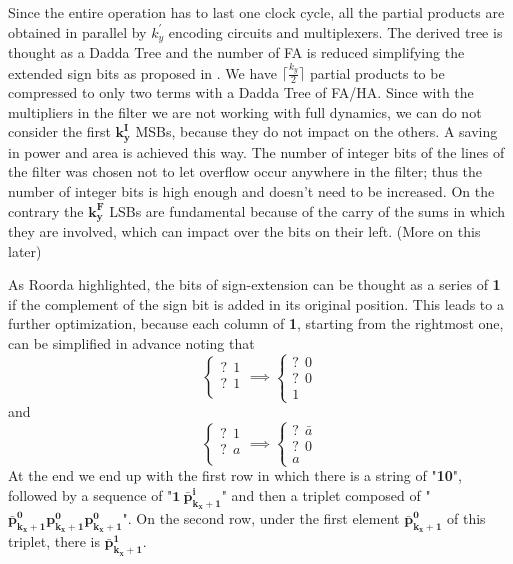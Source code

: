 \documentclass[a4paper]{article}
\begin{document}
	Since the entire operation has to last one clock cycle, all the partial products are obtained in parallel by $k^{'}_{y}$ encoding circuits and multiplexers. The derived tree is thought as a Dadda Tree and the number of FA is reduced
	simplifying the extended sign bits as proposed in \cite{roorda}.
	We have $\lceil \frac{k_y}{2} \rceil $ partial products to be compressed to only two terms with a Dadda Tree of FA/HA.
	Since with the multipliers in the filter we are not working with full dynamics, we can do not consider the first $\bm{k_y^I}$ MSBs, because they do not
	impact on the others. A saving in power and area is achieved this way. The number of integer bits of the lines of the filter was chosen not to let overflow occur anywhere in the filter; thus the number of integer bits is high enough and doesn't need to be increased. On the contrary the $\bm{k_y^F}$ LSBs are fundamental because of the carry of the sums in which they are involved, which can impact over the bits on their left. (More on this later)

	As Roorda highlighted, the bits of sign-extension can be thought as a series of \textbf{1} if the complement of the sign bit is added in its original position.
	This leads to a further optimization, because each column of \textbf{1}, starting from the rightmost one, can be simplified in advance noting that
	\begin{equation}
		\begin{cases}
        	?\ \ 1\\
        	?\ \ 1\\
        \end{cases}
        \implies
        \begin{cases}
        	?\ \ 0\\
        	?\ \ 0\\
        	1\
        \end{cases}
	\end{equation}
	and
	\begin{equation}
		\begin{cases}
        	?\ \ 1\\
        	?\ \ a\\
        \end{cases}
        \implies
        \begin{cases}
        	?\ \ \bar{a}\\
        	?\ \ 0\\
        	a\
        \end{cases}
	\end{equation}
	At the end we end up with the first row in which there is a string of "\textbf{10}", followed by a sequence of "$\bm{1\ \bar{p}_{k_{x}+1}^i}$" and then a triplet composed of "$\bm{\bar{p}_{k_{x}+1}^0 p_{k_{x}+1}^0 p_{k_{x}+1}^0}$". On the second row, under the first element $\bm{\bar{p}_{k_{x}+1}^0}$ of this triplet, there is $\bm{\bar{p}_{k_{x}+1}^1}$.\\
\end{document}
